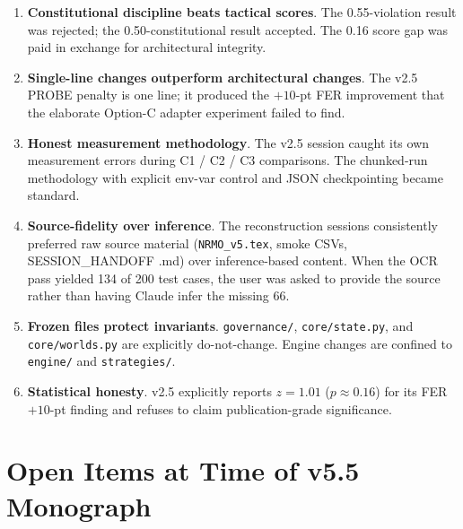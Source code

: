 \begin{enumerate}
\item \textbf{Constitutional discipline beats tactical scores}.
The 0.55-violation result was rejected; the 0.50-constitutional
result accepted. The 0.16 score gap was paid in exchange for
architectural integrity.

\item \textbf{Single-line changes outperform architectural
changes}. The v2.5 PROBE penalty is one line; it produced the
$+10$-pt FER improvement that the elaborate Option-C adapter
experiment failed to find.

\item \textbf{Honest measurement methodology}. The v2.5 session
caught its own measurement errors during C1 / C2 / C3 comparisons.
The chunked-run methodology with explicit env-var control and JSON
checkpointing became standard.

\item \textbf{Source-fidelity over inference}. The reconstruction
sessions consistently preferred raw source material
(\texttt{NRMO\_v5.tex}, smoke CSVs, SESSION\_HANDOFF .md) over
inference-based content. When the OCR pass yielded 134 of 200 test
cases, the user was asked to provide the source rather than
having Claude infer the missing 66.

\item \textbf{Frozen files protect invariants}.
\texttt{governance/}, \texttt{core/state.py}, and
\texttt{core/worlds.py} are explicitly do-not-change. Engine
changes are confined to \texttt{engine/} and
\texttt{strategies/}.

\item \textbf{Statistical honesty}. v2.5 explicitly reports
$z = 1.01$ ($p \approx 0.16$) for its FER $+10$-pt finding and
refuses to claim publication-grade significance.
\end{enumerate}

\section{Open Items at Time of v5.5 Monograph}
\label{sec:session-log-open-items}

